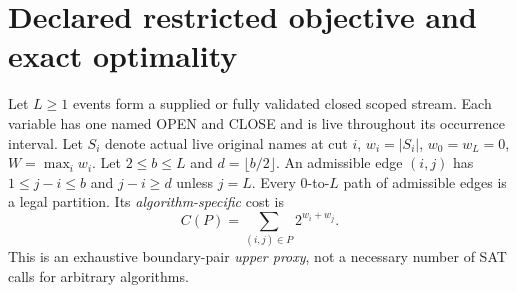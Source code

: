 \documentclass[11pt]{article}
\begin{document}
\section{Declared restricted objective and exact optimality}
Let $L\ge 1$ events form a supplied or fully validated closed scoped stream. Each variable has one named OPEN and CLOSE and is live throughout its occurrence interval. Let $S_i$ denote actual live original names at cut $i$, $w_i=|S_i|$, $w_0=w_L=0$, $W=\max_iw_i$. Let $2\le b\le L$ and $d=\lfloor b/2\rfloor$. An admissible edge $(i,j)$ has $1\le j-i\le b$ and $j-i\ge d$ unless $j=L$. Every $0$-to-$L$ path of admissible edges is a legal partition. Its \emph{algorithm-specific} cost is
\[
C(P)=\sum_{(i,j)\in P}2^{w_i+w_j}.
\]
This is an exhaustive boundary-pair \emph{upper proxy}, not a necessary number of SAT calls for arbitrary algorithms.
\end{document}
